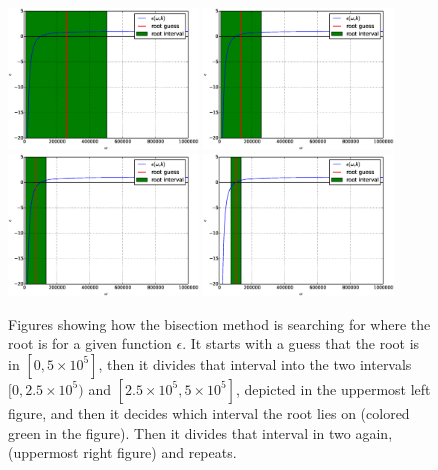 \documentclass[x11names]{article}
\begin{document}
  \begin{figure}
  \centering
    \includegraphics[width = 0.45\textwidth]{figures/bisection_100_0}
    \includegraphics[width = 0.45\textwidth]{figures/bisection_100_1}
    \includegraphics[width = 0.45\textwidth]{figures/bisection_100_2}
    \includegraphics[width = 0.45\textwidth]{figures/bisection_100_3}
    \caption{Figures showing how the bisection method is searching for where the root is for a given function \(\epsilon\). It starts with a guess that the root is in \([0,5\times 10^5]\), then it divides that interval into the two intervals \([0,2.5\times 10^5)\) and \([2.5\times 10^5, 5\times 10^5]\), depicted in the uppermost left figure, and then it decides which interval the root lies on (colored green in the figure). Then it divides that interval in two again, (uppermost right figure) and repeats.}
    \label{fig:bisection}
  \end{figure}
\end{document}
